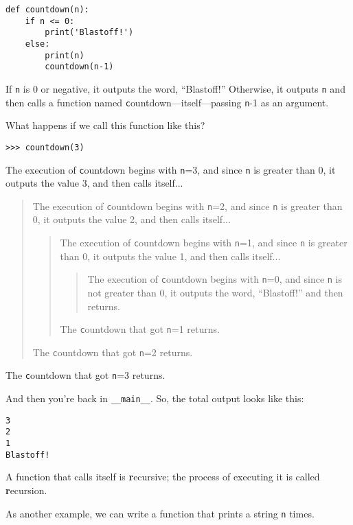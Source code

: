 \documentclass[
DIV=11,
fontsize=13,
twoside,
headinclude=false,
titlepage=firstiscover,
abstract=true,
headsepline=true,
footsepline=true,
chapterprefix=true, %
headings=big,
bibliography=totoc,%
captions=tableheading
]{scrbook}
\theoremstyle{definition}
\begin{document}
\begin{lstlisting}
def countdown(n):
    if n <= 0:
        print('Blastoff!')
    else:
        print(n)
        countdown(n-1)
\end{lstlisting}
%
If {\texttt n} is 0 or negative, it outputs the word, ``Blastoff!''
Otherwise, it outputs {\texttt n} and then calls a function named {\texttt
countdown}---itself---passing {\texttt n-1} as an argument.

What happens if we call this function like this?

\begin{lstlisting}
>>> countdown(3)
\end{lstlisting}
%
The execution of {\texttt countdown} begins with {\texttt n=3}, and since
{\texttt n} is greater than 0, it outputs the value 3, and then calls itself...

\begin{quote}
The execution of {\texttt countdown} begins with {\texttt n=2}, and since
{\texttt n} is greater than 0, it outputs the value 2, and then calls itself...

\begin{quote}
The execution of {\texttt countdown} begins with {\texttt n=1}, and since
{\texttt n} is greater than 0, it outputs the value 1, and then calls itself...

\begin{quote}
The execution of {\texttt countdown} begins with {\texttt n=0}, and since {\texttt
n} is not greater than 0, it outputs the word, ``Blastoff!'' and then
returns.
\end{quote}

The {\texttt countdown} that got {\texttt n=1} returns.
\end{quote}

The {\texttt countdown} that got {\texttt n=2} returns.
\end{quote}

The {\texttt countdown} that got {\texttt n=3} returns.

And then you're back in \verb"__main__".  So, the
total output looks like this:

\begin{lstlisting}
3
2
1
Blastoff!
\end{lstlisting}
%
A function that calls itself is {\textbf recursive}; the process of
executing it is called {\textbf recursion}.

As another example, we can write a function that prints a
string {\texttt n} times.
\end{document}
